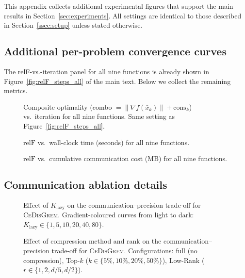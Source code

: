 \documentclass[review,onefignum,onetabnum]{siamart171218}
\begin{document}
	This appendix collects additional experimental figures that
	support the main results in Section~\ref{sec:experiments}.
	All settings are identical to those described in
	Section~\ref{ssec:setup} unless stated otherwise.
	
	\subsection{Additional per-problem convergence curves}
	
	The relF-vs.-iteration panel for all nine functions is already shown
	in Figure~\ref{fig:relF_steps_all} of the main text.
	Below we collect the remaining metrics.
	
	\begin{figure}[htbp]
		\centering
		\caption{Composite optimality (combo $=\|\nabla f(\bar x_k)\|+\mathrm{cons}_k$)
			vs.\ iteration for all nine functions.
			Same setting as Figure~\ref{fig:relF_steps_all}.}
		\label{fig:app_combo_steps}
	\end{figure}
	
	\begin{figure}[htbp]
		\centering
		\caption{$\mathrm{relF}$ vs.\ wall-clock time (seconds) for all nine
			functions.}
		\label{fig:app_relF_time}
	\end{figure}
	
	\begin{figure}[htbp]
		\centering
		\caption{$\mathrm{relF}$ vs.\ cumulative communication cost (MB) for
			all nine functions.}
		\label{fig:app_relF_comm}
	\end{figure}
	
	\subsection{Communication ablation details}
	
	\begin{figure}[htbp]
		\centering
		\caption{Effect of $K_{\mathrm{lazy}}$ on the
			communication--precision trade-off for \textsc{CeDisGrem}.
			Gradient-coloured curves from light to dark:
			$K_{\mathrm{lazy}}\in\{1,5,10,20,40,80\}$.}
		\label{fig:klazy}
	\end{figure}
	
	\begin{figure}[htbp]
		\centering
		\caption{Effect of compression method and rank on the
			communication--precision trade-off for \textsc{CeDisGrem}.
			Configurations: full (no compression),
			Top-$k$ ($k\in\{5\%,10\%,20\%,50\%\}$),
			Low-Rank ($r\in\{1,2,d/5,d/2\}$).}
		\label{fig:compress}
	\end{figure}
	
\end{document}
